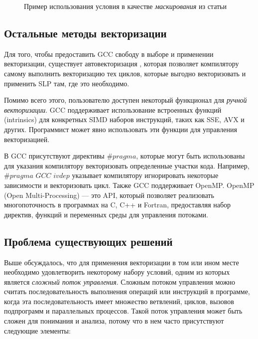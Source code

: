 \begin{figure}[!htb]
    \centering
    
    \caption{Пример использования условия в качестве \textit{маскирования} из статьи}
    \label{pohl2}
\end{figure}

\subsection{Остальные методы векторизации}
Для того, чтобы предоставить GCC свободу в выборе и применении векторизации, существует автовекторизация \cite{naishlos2004autovectorization}, которая позволяет компилятору самому выполнить векторизацию тех циклов, которые выгодно векторизовать и применить SLP там, где это необходимо. 

Помимо всего этого, пользователю доступен некоторый функционал для \textit{ручной векторизации}. GCC поддерживает использование встроенных функций (intrinsics) для конкретных SIMD наборов инструкций, таких как SSE, AVX и других. Программист может явно использовать эти функции для управления векторизацией.

В GCC присутствуют директивы $\#pragma$, которые могут быть использованы для указания компилятору векторизовать определенные участки кода. Например, $\#pragma$ $GCC$ $ivdep$ указывает компилятору игнорировать некоторые зависимости и векторизовать цикл. Также GCC поддерживает OpenMP. OpenMP (Open Multi-Processing) — это API, который позволяет реализовать многопоточность в программах на C, C++ и Fortran, предоставляя набор директив, функций и переменных среды для управления потоками.


\subsection{Проблема существующих решений}
Выше обсуждалось, что для применения векторизации в том или ином месте необходимо удовлетворить некоторому набору условий, одним из которых является \textit{сложный поток управления}. Сложным потоком управления можно считать последовательность выполнения операций или инструкций в программе, когда эта последовательность имеет множество ветвлений, циклов, вызовов подпрограмм и параллельных процессов. Такой поток управления может быть сложен для понимания и анализа, потому что в нем часто присутствуют следующие элементы:

